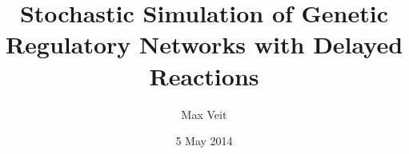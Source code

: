 \documentclass[english,letterpaper,12pt]{article}
\begin{document}
\title{Stochastic Simulation of Genetic Regulatory Networks with Delayed Reactions}
\author{Max Veit}
\date{5 May 2014}


\maketitle

\tableofcontents
\end{document}
